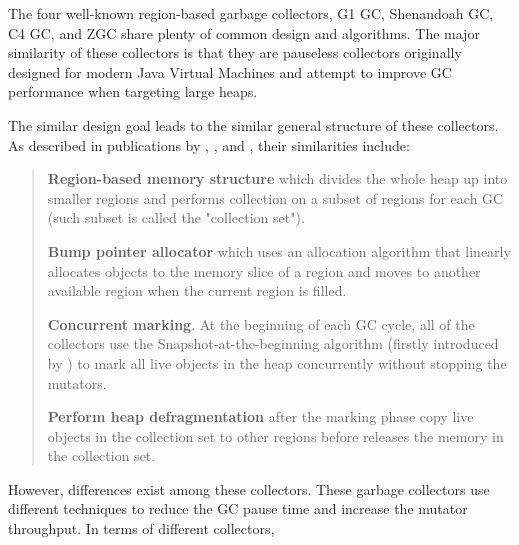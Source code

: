 The four well-known region-based garbage collectors, G1 GC, Shenandoah GC, C4 GC, and
ZGC share plenty of common design and algorithms. The major similarity of these collectors
is that they are pauseless collectors originally designed for modern Java Virtual
Machines and attempt to improve GC performance when targeting large heaps.

The similar design goal leads to the similar general structure of these collectors.
As described in publications by \cite{detlefs2004garbage}, \cite{flood2016shenandoah},
\cite{tene2011c4} and \cite{liden_karlsson_2018}, their similarities include:

\begin{quote}
  \textbf{Region-based memory structure}
    which divides the whole heap up into smaller regions and performs collection
    on a subset of regions for each GC (such subset is called the "collection set").

  \textbf{Bump pointer allocator}
    which uses an allocation algorithm that linearly allocates objects to the memory
    slice of a region and moves to another available region when the current region is filled.

  \textbf{Concurrent marking}.
    At the beginning of each GC cycle, all of the collectors use the Snapshot-at-the-beginning algorithm
    (firstly introduced by \cite{yuasa1990real}) to mark all live objects in the heap
    concurrently without stopping the mutators.

  \textbf{Perform heap defragmentation}
    after the marking phase copy live objects in the collection set to other
    regions before releases the memory in the collection set.
\end{quote}

However, differences exist among these collectors. These garbage collectors use
different techniques to reduce the GC pause time and increase the mutator throughput.
In terms of different collectors,

